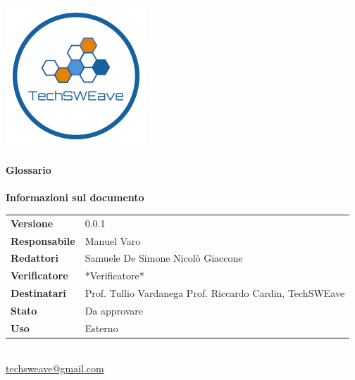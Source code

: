 \documentclass[a4paper]{article}
\begin{document}
\begin{titlepage}
    \begin{center}
        \includegraphics{../../../Images/logo}\\
        \vspace{20px}
        \textcolor{logo}{\hrulefill}\\
        \vspace{20px}
        \textbf{\huge\textcolor{logo}{Glossario}}\\
        \vspace{10px}
        \textcolor{logo}{\hrulefill}\\
        \vspace{40px}
        \textbf{\Large Informazioni sul documento}\\
        \vspace{20px}
        \begin{tabular}{p{100px} | p{100px}}
            \textbf{Versione}     & 0.0.1                                                                      \\
            \textbf{Responsabile} & Manuel Varo                                                                \\
            \textbf{Redattori}    & Samuele De Simone \newline Nicolò Giaccone                                 \\
            \textbf{Verificatore} & *Verificatore*                                                             \\
            \textbf{Destinatari}  & Prof. Tullio Vardanega \newline Prof. Riccardo Cardin, \newline TechSWEave \\
            \textbf{Stato}        & Da approvare                                                               \\
            \textbf{Uso}          & Esterno                                                                    \\
        \end{tabular}\\
        \vspace{60px}
        \href{mailto:techsweave@gmail.com}{techsweave@gmail.com}\\

    \end{center}
\end{titlepage}
\end{document}
